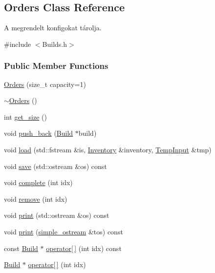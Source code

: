 \subsection{Orders Class Reference}
\label{class_orders}


A megrendelt konfigokat tárolja.  




{\ttfamily \#include $<$Builds.\+h$>$}

\subsubsection*{Public Member Functions}
\begin{DoxyCompactItemize}
\item 
\mbox{\hyperlink{class_orders_aa52a641a269671bbf68637e0771e8b5d}{Orders}} (size\+\_\+t capacity=1)
\item 
\mbox{\hyperlink{class_orders_a12bcbd0cd430b51f65f651fddad3f662}{$\sim$\+Orders}} ()
\item 
int \mbox{\hyperlink{class_orders_a9b6a5342d1fe2954f061d91609d3fe89}{get\+\_\+size}} ()
\item 
void \mbox{\hyperlink{class_orders_a6d8d6db032983700fa68cca43dc75a38}{push\+\_\+back}} (\mbox{\hyperlink{class_build}{Build}} $\ast$build)
\item 
void \mbox{\hyperlink{class_orders_af0edb320aab3dcae0ee615a5459b5595}{load}} (std\+::fstream \&is, \mbox{\hyperlink{class_inventory}{Inventory}} \&inventory, \mbox{\hyperlink{struct_temp_input}{Temp\+Input}} \&tmp)
\item 
void \mbox{\hyperlink{class_orders_a80770bd5dffc2d83de0e9acfaad14229}{save}} (std\+::ostream \&os) const
\item 
void \mbox{\hyperlink{class_orders_a6a47de51d6d88328ff6408482f614e8e}{complete}} (int idx)
\item 
void \mbox{\hyperlink{class_orders_a36a43f158466760d315ca23ac24bd4bd}{remove}} (int idx)
\item 
void \mbox{\hyperlink{class_orders_a57fb3a5db65235ac3eb6dee473f7ef34}{print}} (std\+::ostream \&os) const
\item 
void \mbox{\hyperlink{class_orders_a081beda059e45de92599fa48a8668c54}{print}} (\mbox{\hyperlink{structsimple__ostream}{simple\+\_\+ostream}} \&tos) const
\item 
const \mbox{\hyperlink{class_build}{Build}} $\ast$ \mbox{\hyperlink{class_orders_aab4445872bb7f3d952ebc89f6b2bd146}{operator\mbox{[}$\,$\mbox{]}}} (int idx) const
\item 
\mbox{\hyperlink{class_build}{Build}} $\ast$ \mbox{\hyperlink{class_orders_aca77a601a993ef2d5dcfb71b9ee41542}{operator\mbox{[}$\,$\mbox{]}}} (int idx)
\end{DoxyCompactItemize}



